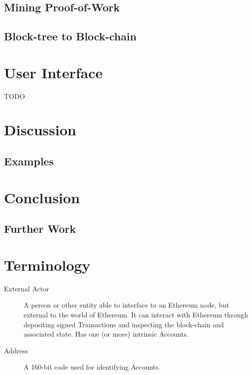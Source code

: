 \documentclass[9pt,oneside]{amsart}
\begin{document}
\begin{multicols}{2}
\subsection{Mining Proof-of-Work} \label{ch:pow}

\subsection{Block-tree to Block-chain} \label{ch:ghost}


\section{User Interface}

TODO 

\section{Discussion} \label{ch:discussion}

\subsection{Examples} \label{ch:examples}

\section{Conclusion} \label{ch:conclusion}

\subsection{Further Work} \label{ch:further}




\appendix

\section{Terminology}

\begin{description}
\item[External Actor] A person or other entity able to interface to an Ethereum node, but external to the world of Ethereum. It can interact with Ethereum through depositing signed Transactions and inspecting the block-chain and associated state. Has one (or more) intrinsic Accounts.

\item[Address] A 160-bit code used for identifying Accounts.


\end{description}
\end{multicols}
\end{document}
